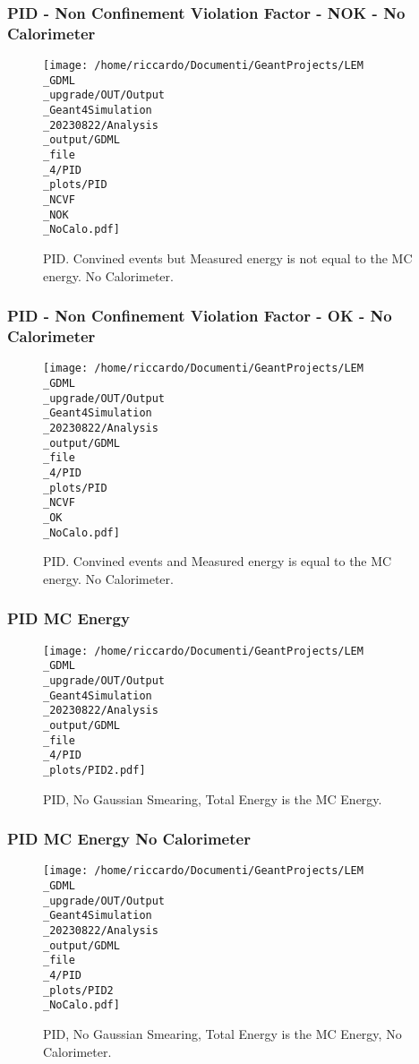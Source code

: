 \documentclass[8pt]{beamer}
\begin{document}
            \begin{frame}
                \frametitle{PID - Non Confinement Violation Factor - NOK - No Calorimeter}
            
        \begin{figure}[h]
            \centering
            \texttt{[image: /home/riccardo/Documenti/GeantProjects/LEM\\\_GDML\\\_upgrade/OUT/Output\\\_Geant4Simulation\\\_20230822/Analysis\\\_output/GDML\\\_file\\\_4/PID\\\_plots/PID\\\_NCVF\\\_NOK\\\_NoCalo.pdf]}
            \caption{PID. Convined events but Measured energy is not equal to the MC energy. No Calorimeter.}
        \end{figure}
        
            \end{frame}
            
            \begin{frame}
                \frametitle{PID - Non Confinement Violation Factor - OK - No Calorimeter}
            
        \begin{figure}[h]
            \centering
            \texttt{[image: /home/riccardo/Documenti/GeantProjects/LEM\\\_GDML\\\_upgrade/OUT/Output\\\_Geant4Simulation\\\_20230822/Analysis\\\_output/GDML\\\_file\\\_4/PID\\\_plots/PID\\\_NCVF\\\_OK\\\_NoCalo.pdf]}
            \caption{PID. Convined events and Measured energy is equal to the MC energy. No Calorimeter.}
        \end{figure}
        
            \end{frame}
            
            \begin{frame}
                \frametitle{PID MC Energy}
            
        \begin{figure}[h]
            \centering
            \texttt{[image: /home/riccardo/Documenti/GeantProjects/LEM\\\_GDML\\\_upgrade/OUT/Output\\\_Geant4Simulation\\\_20230822/Analysis\\\_output/GDML\\\_file\\\_4/PID\\\_plots/PID2.pdf]}
            \caption{PID, No Gaussian Smearing, Total Energy is the MC Energy.}
        \end{figure}
        
            \end{frame}
            
            \begin{frame}
                \frametitle{PID MC Energy No Calorimeter}
            
        \begin{figure}[h]
            \centering
            \texttt{[image: /home/riccardo/Documenti/GeantProjects/LEM\\\_GDML\\\_upgrade/OUT/Output\\\_Geant4Simulation\\\_20230822/Analysis\\\_output/GDML\\\_file\\\_4/PID\\\_plots/PID2\\\_NoCalo.pdf]}
            \caption{PID, No Gaussian Smearing, Total Energy is the MC Energy, No Calorimeter.}
        \end{figure}
        
            \end{frame}
            
\end{document}
